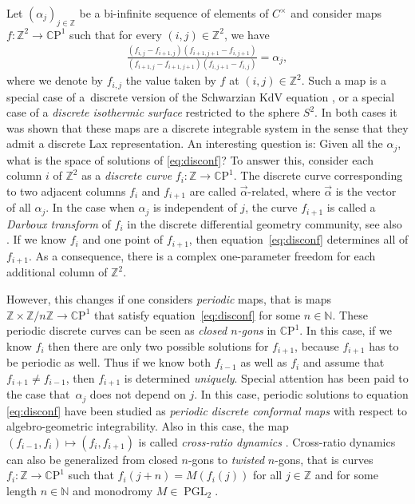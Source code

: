 \documentclass[10pt,a4paper]{amsart}
\numberwithin{equation}{section}
\newcommand{\Z}{{\mathbb Z}}
\newcommand{\N}{{\mathbb N}}
\newcommand{\C}{{\mathbb C}}
\newcommand{\CP}{{\mathbb C\mathrm P}}
\newcommand{\PGL}{\operatorname{PGL}}
\def\C{C}
\begin{document}
	Let $(\alpha_j)_{j\in\Z}$ be a bi-infinite sequence of elements of $ \C^\times$ and consider maps $f\colon \Z^2 \rightarrow \CP^1$ such that for every $(i,j)\in\Z^2$, we have
	\begin{align}
		\frac{(f_{i,j}-f_{i+1,j})(f_{i+1,j+1}-f_{i,j+1}) }{(f_{i+1,j}-f_{i+1,j+1})(f_{i,j+1}-f_{i,j})} = \alpha_j,
		\label{eq:disconf}
	\end{align}
	where we denote by $f_{i,j}$ the value taken by $f$ at $(i,j)\in\Z^2$. Such a map is a special case of a~discrete version of the Schwarzian KdV equation \cite{NC}, or a special case of a \emph{discrete isothermic surface} \cite{BP} restricted to the sphere $S^2$. In both cases it was shown that these maps are a discrete integrable system in the sense that they admit a discrete Lax representation. An interesting question is: Given all the $\alpha_j$, what is the space of solutions of \eqref{eq:disconf}? To answer this, consider each column $i$ of $\Z^2$ as a \emph{discrete curve} $f_i\colon \Z\rightarrow \CP^1$. The discrete curve corresponding to two adjacent columns $f_i$ and $f_{i+1}$ are called $\vec\alpha$-related, where $\vec\alpha$ is the vector of all $\alpha_j$. In the case when $\alpha_j$ is independent of $j$, the curve $f_{i+1}$ is called a \emph{Darboux transform} \cite{hjbook} of $f_i$ in the discrete differential geometry community, see also \cite{bsddgbook}. If we know $f_i$ and one point of $f_{i+1}$, then equation~\eqref{eq:disconf} determines all of $f_{i+1}$. As a consequence, there is a complex one-parameter freedom for each additional column of $\Z^2$.
	
	However, this changes if one considers \emph{periodic} maps, that is maps $\Z \times \Z/n\Z\rightarrow \CP^1$ that satisfy equation~\eqref{eq:disconf} for some $n\in \N$. These periodic discrete curves can be seen as \emph{closed $n$-gons} in $\CP^1$. In this case, if we know $f_i$ then there are only two possible solutions for $f_{i+1}$, because $f_{i+1}$ has to be periodic as well. Thus if we know both $f_{i-1}$ as well as $f_i$ and assume that $f_{i+1} \neq f_{i-1}$, then $f_{i+1}$ is determined \emph{uniquely}. Special attention has been paid to the case that~$\alpha_j$ does not depend on $j$. In this case, periodic solutions to equation \eqref{eq:disconf} have been studied as \emph{periodic discrete conformal maps} \cite{HMNP} with respect to algebro-geometric integrability. Also in this case, the map $(f_{i-1},f_i) \mapsto (f_i,f_{i+1})$ is called \emph{cross-ratio dynamics} \cite{AFIT}. Cross-ratio dynamics can also be generalized from closed $n$-gons to \emph{twisted} $n$-gons, that is curves $f_i\colon \Z \rightarrow \CP^1$ such that $f_i(j+n) = M(f_i(j))$ for all $j\in \Z$ and for some {length} $n\in \N$ and monodromy $M\in \PGL_2$.
	
\end{document}
